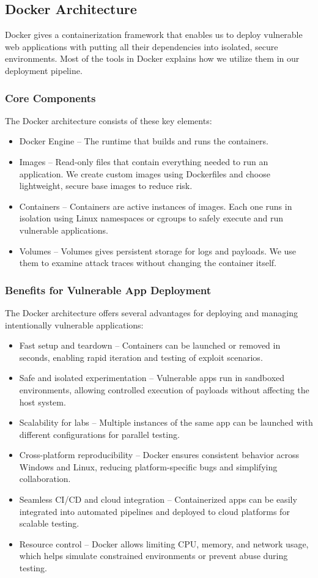 \documentclass[12pt]{article}
\begin{document}
\subsection{Docker Architecture}
Docker gives a containerization framework that enables us to deploy vulnerable web applications with putting all their dependencies into isolated, secure environments. Most of the tools in Docker explains how we utilize them in our deployment pipeline.

\subsubsection{Core Components}
The Docker architecture consists of these key elements:
  \begin{itemize}
    \item {Docker Engine} – The runtime that builds and runs the containers.
    \item {Images} – Read-only files that contain everything needed to run an application. We create custom images using Dockerfiles and choose lightweight, secure base images to reduce risk.
    \item {Containers} – Containers are active instances of images. Each one runs in isolation using Linux namespaces or cgroups to safely execute and run vulnerable applications.
    \item {Volumes} – Volumes gives persistent storage for logs and payloads. We use them to examine attack traces without changing the container itself.
    \end{itemize}

\subsubsection{Benefits for Vulnerable App Deployment}
The Docker architecture offers several advantages for deploying and managing intentionally vulnerable applications:
  \begin{itemize}
    \item {Fast setup and teardown} – Containers can be launched or removed in seconds, enabling rapid iteration and testing of exploit scenarios.
    \item {Safe and isolated experimentation} – Vulnerable apps run in sandboxed environments, allowing controlled execution of payloads without affecting the host system.
	\item {Scalability for labs} – Multiple instances of the same app can be launched with different configurations for parallel testing.
    \item {Cross-platform reproducibility} – Docker ensures consistent behavior across Windows and Linux, reducing platform-specific bugs and simplifying collaboration.
    \item {Seamless CI/CD and cloud integration} – Containerized apps can be easily integrated into automated pipelines and deployed to cloud platforms for scalable testing.
	\item {Resource control} – Docker allows limiting CPU, memory, and network usage, which helps simulate constrained environments or prevent abuse during testing.
  \end{itemize}
\end{document}
